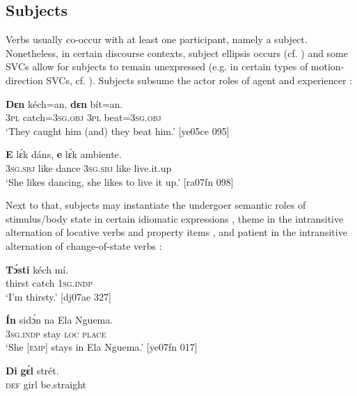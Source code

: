 \subsection{Subjects}

Verbs usually co-occur with at least one participant, namely a subject. Nonetheless, in certain discourse contexts, subject ellipsis occurs (cf. ) and some SVCs allow for subjects to remain unexpressed (e.g. in certain types of motion-direction SVCs, cf. ). Subjects subsume the actor roles of agent  and experiencer :


\ea%
    \label{ex:key:1039}
    \gll \textbf{Dɛn}  kéch=an,    \textbf{dɛn}  bít=an.\\
\textsc{3pl}  catch=\textsc{3sg.obj}  \textsc{3pl}  beat=\textsc{3sg.obj}\\

\glt ‘They caught him (and) they beat him.’ [ye05ce 095]
\z


\ea%
    \label{ex:key:1040}
    \gll \textbf{E}    lɛ́k  dáns,  \textbf{e}    lɛ́k  ambiente.\\
\textsc{3sg.sbj}  like  dance  \textsc{3sg.sbj}  like  live.it.up\\

\glt ‘She likes dancing, she likes to live it up.’ [ra07fn 098]
\z

Next to that, subjects may instantiate the undergoer semantic roles of stimulus/body state in certain idiomatic expressions , theme in the intransitive alternation of locative verbs  and property items , and patient in the intransitive alternation of change-of-state verbs :


\ea%
    \label{ex:key:1041}
    \gll \textbf{Tɔ́sti}  kéch  mí.\\
thirst  catch  \textsc{1sg.indp}\\

\glt ‘I’m thirsty.’ [dj07ae 327]
\z


\ea%
    \label{ex:key:1042}
    \gll \textbf{\'{I}n}    sidɔ́n  na  Ela Nguema.\\
\textsc{3sg.indp}  stay    \textsc{loc}  \textsc{place}\\

\glt ‘She [\textsc{emp}] stays in Ela Nguema.’ [ye07fn 017]
\z


\ea%
    \label{ex:key:1043}
    \gll \textbf{Di}  \textbf{gɛ́l}  strét.\\
\textsc{def}  girl  be.straight\\

